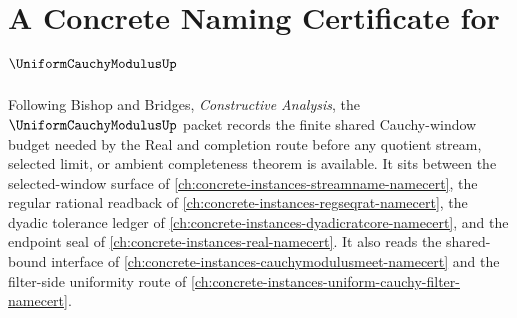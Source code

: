 \chapter{A Concrete Naming Certificate for $\UniformCauchyModulusUp$}
\label{ch:concrete-instances-uniform-cauchy-modulus-namecert}

Following Bishop and Bridges, \emph{Constructive Analysis}, the $\UniformCauchyModulusUp$ packet records the finite shared Cauchy-window budget needed by the Real and completion route before any quotient stream, selected limit, or ambient completeness theorem is available. It sits between the selected-window surface of \autoref{ch:concrete-instances-streamname-namecert}, the regular rational readback of \autoref{ch:concrete-instances-regseqrat-namecert}, the dyadic tolerance ledger of \autoref{ch:concrete-instances-dyadicratcore-namecert}, and the endpoint seal of \autoref{ch:concrete-instances-real-namecert}. It also reads the shared-bound interface of \autoref{ch:concrete-instances-cauchymodulusmeet-namecert} and the filter-side uniformity route of \autoref{ch:concrete-instances-uniform-cauchy-filter-namecert}.

